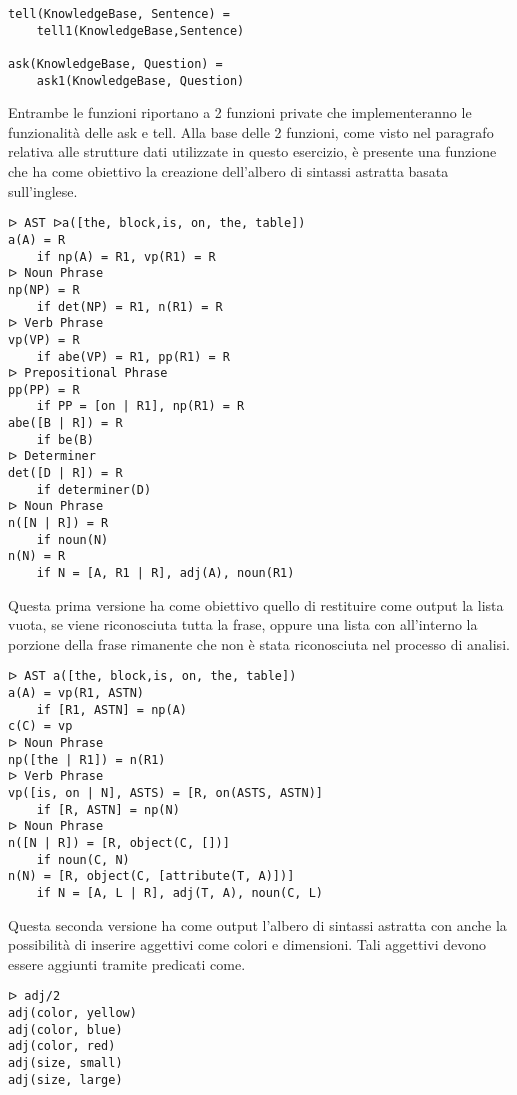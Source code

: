 \documentclass[12pt,twoside]{report}
\begin{document}
\begin{lstlisting}
tell(KnowledgeBase, Sentence) = 
    tell1(KnowledgeBase,Sentence)

ask(KnowledgeBase, Question) = 
    ask1(KnowledgeBase, Question)
\end{lstlisting}

Entrambe le funzioni riportano a 2 funzioni private che implementeranno le funzionalità delle ask e tell. Alla base delle 2 funzioni, come visto nel paragrafo relativa alle strutture dati utilizzate in questo esercizio, è presente una funzione che ha come obiettivo la creazione dell'albero di sintassi astratta basata sull'inglese. 

\begin{lstlisting}
ᐅ AST ᐅa([the, block,is, on, the, table])
a(A) = R
    if np(A) = R1, vp(R1) = R
ᐅ Noun Phrase
np(NP) = R
    if det(NP) = R1, n(R1) = R
ᐅ Verb Phrase
vp(VP) = R
    if abe(VP) = R1, pp(R1) = R
ᐅ Prepositional Phrase
pp(PP) = R
    if PP = [on | R1], np(R1) = R
abe([B | R]) = R
    if be(B)
ᐅ Determiner
det([D | R]) = R
    if determiner(D)
ᐅ Noun Phrase
n([N | R]) = R
    if noun(N)
n(N) = R
    if N = [A, R1 | R], adj(A), noun(R1) 
\end{lstlisting}

Questa prima versione ha come obiettivo quello di restituire come output la lista vuota, se viene riconosciuta tutta la frase, oppure una lista con all'interno la porzione della frase rimanente che non è stata riconosciuta nel processo di analisi.

\begin{lstlisting}
ᐅ AST a([the, block,is, on, the, table])
a(A) = vp(R1, ASTN)
    if [R1, ASTN] = np(A)
c(C) = vp
ᐅ Noun Phrase
np([the | R1]) = n(R1)
ᐅ Verb Phrase
vp([is, on | N], ASTS) = [R, on(ASTS, ASTN)]
    if [R, ASTN] = np(N)
ᐅ Noun Phrase
n([N | R]) = [R, object(C, [])]
    if noun(C, N)
n(N) = [R, object(C, [attribute(T, A)])]
    if N = [A, L | R], adj(T, A), noun(C, L) 
\end{lstlisting}

Questa seconda versione ha come output l'albero di sintassi astratta con anche la possibilità di inserire aggettivi come colori e dimensioni. Tali aggettivi devono essere aggiunti tramite predicati come.

\begin{lstlisting}
ᐅ adj/2
adj(color, yellow)
adj(color, blue)
adj(color, red)
adj(size, small)
adj(size, large)
\end{lstlisting}
\end{document}
